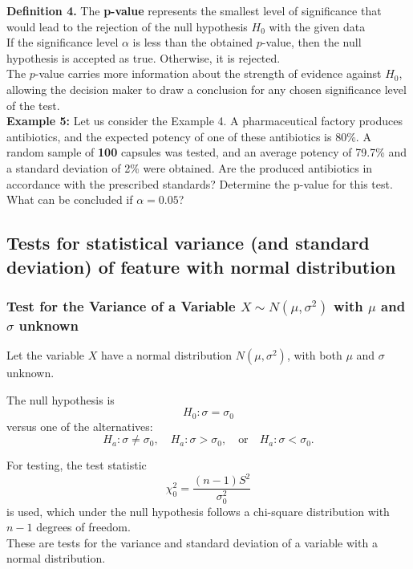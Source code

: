 \documentclass[a4paper, 12pt]{article}
\begin{document}
\textbf{Definition 4.} The \textbf{p-value} represents the smallest level of
significance that would lead to the rejection of the null
hypothesis $H_0$ with the given data\\

If the significance level $\alpha$ is less than the obtained $p$-value, then the null hypothesis is accepted as true. Otherwise, it is rejected.  \\

The $p$-value carries more information about the strength of evidence against $H_0$, allowing the decision maker to draw a conclusion for any chosen significance level of the test.\\

\textbf{Example 5:} Let us consider the Example 4. A pharmaceutical factory produces antibiotics, and the expected potency of one of these antibiotics is 80\%. A random sample of \textbf{100} capsules was tested, and an average potency of 79.7\% and a standard deviation of 2\% were obtained. Are the produced antibiotics in accordance with the prescribed standards? Determine the p-value for this test. What can be concluded if $\alpha = 0.05$?


\subsection{Tests for statistical variance (and standard deviation) of feature with normal distribution}

\subsubsection{Test for the Variance of a Variable $X \sim N(\mu, \sigma^2)$ with $\mu$ and $\sigma$ unknown}

Let the variable $X$ have a normal distribution $N(\mu, \sigma^2)$, with both $\mu$ and $\sigma$ unknown.  

The null hypothesis is
\[
H_0: \sigma = \sigma_0
\]
versus one of the alternatives:
\[
H_a: \sigma \neq \sigma_0, \quad H_a: \sigma > \sigma_0, \quad \text{or} \quad H_a: \sigma < \sigma_0.
\]

For testing, the test statistic
\[
\chi_0^2 = \frac{(n-1) S^2}{\sigma_0^2}
\]
is used, which under the null hypothesis follows a chi-square distribution with $n-1$ degrees of freedom.\\

These are tests for the variance and standard deviation of a variable with a normal distribution.\\
\end{document}
